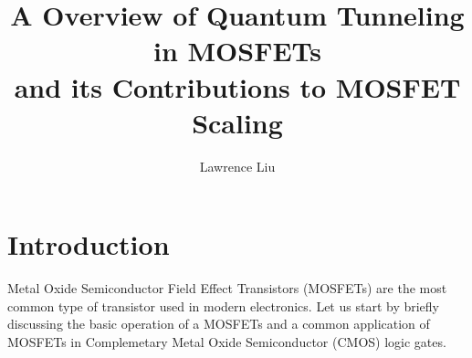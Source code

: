 \documentclass[
  reprint,
  amsmath,amssymb,
  aps
]{revtex4-1}
\begin{document}
\title{A Overview of Quantum Tunneling in MOSFETs\\and its Contributions to MOSFET Scaling}


\author{Lawrence Liu}



\maketitle
{}


\section{\label{sec:level1}Introduction}
Metal Oxide Semiconductor Field Effect Transistors (MOSFETs) are the most common type of transistor used in modern electronics. Let us start 
by briefly discussing the basic operation of a MOSFETs and a common application of MOSFETs in Complemetary Metal Oxide Semiconductor (CMOS) logic gates.
\end{document}
